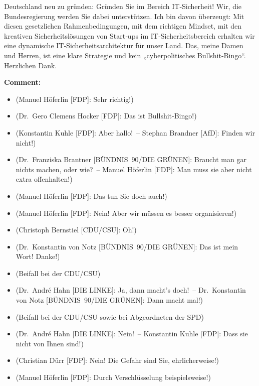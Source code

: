 \documentclass{article}
\begin{document}
Deutschland neu zu gründen: Gründen Sie im Bereich IT‑Sicherheit! Wir, die Bundesregierung werden Sie dabei unterstützen.  Ich bin davon überzeugt: Mit diesen gesetzlichen Rahmenbedingungen, mit dem richtigen Mindset, mit den kreativen Sicherheitslösungen von Start‑ups im IT‑Sicherheitsbereich erhalten wir eine dynamische IT‑Sicherheitsarchitektur für unser Land. Das, meine Damen und Herren, ist eine klare Strategie und kein „cyberpolitisches Bullshit-Bingo“. Herzlichen Dank.  

\noindent\textbf{Comment:}
\begin{itemize}
    \setlength\itemsep{-3pt}
    \item (Manuel Höferlin [FDP]: Sehr richtig!)
    \setlength\itemsep{-3pt}
    \item (Dr. Gero Clemens Hocker [FDP]: Das ist Bullshit-Bingo!)
    \setlength\itemsep{-3pt}
    \item (Konstantin Kuhle [FDP]: Aber hallo! – Stephan Brandner [AfD]: Finden wir nicht!)
    \setlength\itemsep{-3pt}
    \item (Dr. Franziska Brantner [BÜNDNIS 90/DIE GRÜNEN]: Braucht man gar nichts machen, oder wie? – Manuel Höferlin [FDP]: Man muss sie aber nicht extra offenhalten!)
    \setlength\itemsep{-3pt}
    \item (Manuel Höferlin [FDP]: Das tun Sie doch auch!)
    \setlength\itemsep{-3pt}
    \item (Manuel Höferlin [FDP]: Nein! Aber wir müssen es besser organisieren!)
    \setlength\itemsep{-3pt}
    \item (Christoph Bernstiel [CDU/CSU]: Oh!)
    \setlength\itemsep{-3pt}
    \item (Dr. Konstantin von Notz [BÜNDNIS 90/DIE GRÜNEN]: Das ist mein Wort! Danke!)
    \setlength\itemsep{-3pt}
    \item (Beifall bei der CDU/CSU)
    \setlength\itemsep{-3pt}
    \item (Dr. André Hahn [DIE LINKE]: Ja, dann macht’s doch! – Dr. Konstantin von Notz [BÜNDNIS 90/DIE GRÜNEN]: Dann macht mal!)
    \setlength\itemsep{-3pt}
    \item (Beifall bei der CDU/CSU sowie bei Abgeordneten der SPD)
    \setlength\itemsep{-3pt}
    \item (Dr. André Hahn [DIE LINKE]: Nein! – Konstantin Kuhle [FDP]: Dass sie nicht von Ihnen sind!)
    \setlength\itemsep{-3pt}
    \item (Christian Dürr [FDP]: Nein! Die Gefahr sind Sie, ehrlicherweise!)
    \setlength\itemsep{-3pt}
    \item (Manuel Höferlin [FDP]: Durch Verschlüsselung beispielsweise!)
\end{itemize}
\end{document}

